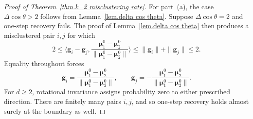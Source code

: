 \documentclass{article}
\theoremstyle{plain}
\theoremstyle{definition}
\newcommand{\1}{\mathbf{1}}
\newcommand{\bmu}{\bm{\mu}}
\begin{document}
\begin{proof}[Proof of Theorem~\ref{thm.k=2 misclustering rate}]
For part~(a), the case $\Delta\cos\theta>2$ follows from Lemma~\ref{lem.delta cos theta}.
Suppose $\Delta\cos\theta=2$ and one-step recovery fails.
The proof of Lemma~\ref{lem.delta cos theta} then produces a misclustered pair $i,j$ for which
\[
2
\leq
\bigg\langle\bm{g}_i-\bm{g}_j,
\frac{\bmu_1^0-\bmu_2^0}{\|\bmu_1^0-\bmu_2^0\|}\bigg\rangle
\leq\|\bm{g}_i\|+\|\bm{g}_j\|
\leq2.
\]
Equality throughout forces
\[
\bm{g}_i=
\frac{\bmu_1^0-\bmu_2^0}{\|\bmu_1^0-\bmu_2^0\|},
\qquad
\bm{g}_j=-
\frac{\bmu_1^0-\bmu_2^0}{\|\bmu_1^0-\bmu_2^0\|}.
\]
For $d\geq2$, rotational invariance assigns probability zero to either prescribed direction.
There are finitely many pairs $i,j$, and so one-step recovery holds almost surely at the boundary as well.


\end{proof}
\end{document}
